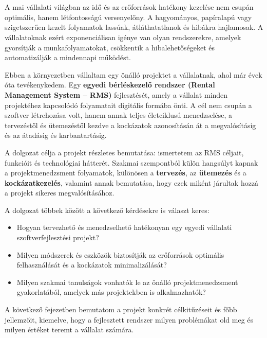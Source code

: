 \chapter{\bevezetes}

A mai vállalati világban az idő és az erőforrások hatékony kezelése nem csupán optimális, hanem létfontosságú versenyelőny. 
A hagyományos, papíralapú vagy szigetszerűen kezelt folyamatok lassúak, átláthatatlanok és hibákra hajlamosak. 
A vállalatoknak ezért exponenciálisan igénye van olyan rendszerekre, amelyek gyorsítják a munkafolyamatokat, csökkentik 
a hibalehetőségeket és automatizálják a mindennapi működést.

Ebben a környezetben vállaltam egy önálló projektet a vállalatnak, ahol már évek óta tevékenykedem.
Egy \textbf{egyedi bérléskezelő rendszer (Rental Management System – RMS)} fejlesztését, 
amely a vállalat minden projektéhez kapcsolódó folyamatait digitális formába önti. 
A cél nem csupán a szoftver létrehozása volt, hanem annak teljes életciklusú menedzselése, 
a tervezéstől és ütemezéstől kezdve a kockázatok azonosításán át a megvalósításig és az átadásig és karbantartásig.

A dolgozat célja a projekt részletes bemutatása: ismertetem az RMS céljait, funkcióit és technológiai hátterét. 
Szakmai szempontból külön hangsúlyt kapnak a projektmenedzsment folyamatok, 
különösen a \textbf{tervezés}, az \textbf{ütemezés} és a \textbf{kockázatkezelés}, valamint annak bemutatása, 
hogy ezek miként járultak hozzá a projekt sikeres megvalósításához.

\vspace{1em}
\noindent A dolgozat többek között a következő kérdésekre is választ keres:
\begin{itemize}
    \item Hogyan tervezhető és menedzselhető hatékonyan egy egyedi vállalati szoftverfejlesztési projekt?
    \item Milyen módszerek és eszközök biztosítják az erőforrások optimális felhasználását és a kockázatok minimalizálását?
    \item Milyen szakmai tanulságok vonhatók le az önálló projektmenedzsment gyakorlatából, amelyek más projektekben is alkalmazhatók?
\end{itemize}

\vspace{1em}
\noindent A következő fejezetben bemutatom a projekt konkrét célkitűzéseit és főbb jellemzőit, 
kiemelve, hogy a fejlesztett rendszer milyen problémákat old meg és milyen értéket teremt a vállalat számára.
